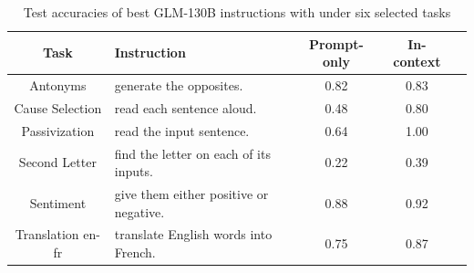








\begin{table}[H]
\caption{Test accuracies of best GLM-130B instructions with \algname under six selected tasks}
\label{tab:glm_instructions}
\begin{center}
\begin{tabular}{cm{7cm}ccc}
\toprule
\textbf{Task} & \textbf{Instruction} & \textbf{Prompt-only} & \textbf{In-context}  \\
\midrule
Antonyms & generate the opposites. & 0.82 & 0.83 \\
\midrule
Cause Selection & read each sentence aloud. & 0.48 & 0.80 \\
\midrule
Passivization & read the input sentence. & 0.64 & 1.00 \\
\midrule
Second Letter & find the letter on each of its inputs. & 0.22 & 0.39  \\
\midrule
Sentiment & give them either positive or negative. & 0.88 & 0.92  \\
\midrule
Translation en-fr & translate English words into French. & 0.75 & 0.87 \\
\bottomrule
\end{tabular}
\end{center}
\end{table}



